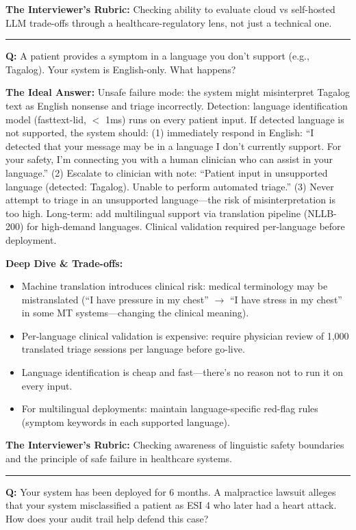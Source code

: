 \textbf{The Interviewer's Rubric:} Checking ability to evaluate cloud vs self-hosted LLM trade-offs through a healthcare-regulatory lens, not just a technical one.

\bigskip\hrule\bigskip

\textbf{Q:} A patient provides a symptom in a language you don't support (e.g., Tagalog). Your system is English-only. What happens?

\textbf{The Ideal Answer:} Unsafe failure mode: the system might misinterpret Tagalog text as English nonsense and triage incorrectly. Detection: language identification model (fasttext-lid, $<$ 1ms) runs on every patient input. If detected language is not supported, the system should: (1) immediately respond in English: ``I detected that your message may be in a language I don't currently support. For your safety, I'm connecting you with a human clinician who can assist in your language.'' (2) Escalate to clinician with note: ``Patient input in unsupported language (detected: Tagalog). Unable to perform automated triage.'' (3) Never attempt to triage in an unsupported language---the risk of misinterpretation is too high. Long-term: add multilingual support via translation pipeline (NLLB-200) for high-demand languages. Clinical validation required per-language before deployment.

\textbf{Deep Dive \& Trade-offs:}
\begin{itemize}
  \item Machine translation introduces clinical risk: medical terminology may be mistranslated (``I have pressure in my chest'' $\rightarrow$ ``I have stress in my chest'' in some MT systems---changing the clinical meaning).
  \item Per-language clinical validation is expensive: require physician review of 1,000 translated triage sessions per language before go-live.
  \item Language identification is cheap and fast---there's no reason not to run it on every input.
  \item For multilingual deployments: maintain language-specific red-flag rules (symptom keywords in each supported language).
\end{itemize}

\textbf{The Interviewer's Rubric:} Checking awareness of linguistic safety boundaries and the principle of safe failure in healthcare systems.

\bigskip\hrule\bigskip

\textbf{Q:} Your system has been deployed for 6 months. A malpractice lawsuit alleges that your system misclassified a patient as ESI 4 who later had a heart attack. How does your audit trail help defend this case?

